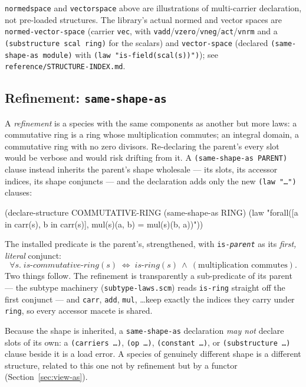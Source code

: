\begin{remark}
\texttt{normedspace} and \texttt{vectorspace} above are illustrations of
multi-carrier declaration, not pre-loaded structures.  The library's actual
normed and vector spaces are \texttt{normed-vector-space} (carrier \texttt{vec},
with \texttt{vadd}/\texttt{vzero}/\texttt{vneg}/\texttt{act}/\texttt{vnrm} and a
\texttt{(substructure scal ring)} for the scalars) and \texttt{vector-space}
(declared \texttt{(same-shape-as module)} with \texttt{(law "is-field(scal(s))")});
see \texttt{reference/STRUCTURE-INDEX.md}.
\end{remark}

\subsection{Refinement: \texttt{same-shape-as}}
\label{sec:same-shape-as}

A \emph{refinement} is a species with the same components as another but more
laws: a commutative ring is a ring whose multiplication commutes; an integral
domain, a commutative ring with no zero divisors.  Re-declaring the parent's
every slot would be verbose and would risk drifting from it.  A
\texttt{(same-shape-as PARENT)} clause instead inherits the parent's shape
wholesale --- its slots, its accessor indices, its shape conjuncts --- and the
declaration adds only the new \texttt{(law "\ldots")} clauses:

\begin{VNBcode}
(declare-structure COMMUTATIVE-RING
  (same-shape-as RING)
  (law "forall([a in carr(s), b in carr(s)], mul(s)(a, b) = mul(s)(b, a))"))
\end{VNBcode}

The installed predicate is the parent's, strengthened, with
\texttt{is-\textit{parent}} as its \emph{first, literal} conjunct:
\[
  \forall s.\;\mathit{is\text{-}commutative\text{-}ring}(s)
    \;\Leftrightarrow\;
    \mathit{is\text{-}ring}(s)\ \wedge\ (\text{multiplication commutes}).
\]
Two things follow.  The refinement is transparently a sub-predicate of its
parent --- the subtype machinery (\texttt{subtype-laws.scm}) reads
\texttt{is-ring} straight off the first conjunct --- and \texttt{carr},
\texttt{add}, \texttt{mul}, \ldots keep exactly the indices they carry under
\texttt{ring}, so every accessor macete is shared.

Because the shape is inherited, a \texttt{same-shape-as} declaration \emph{may
not} declare slots of its own: a \texttt{(carriers \ldots)}, \texttt{(op
\ldots)}, \texttt{(constant \ldots)}, or \texttt{(substructure \ldots)} clause
beside it is a load error.  A species of genuinely different shape is a
different structure, related to this one not by refinement but by a functor
(Section~\ref{sec:view-as}).

